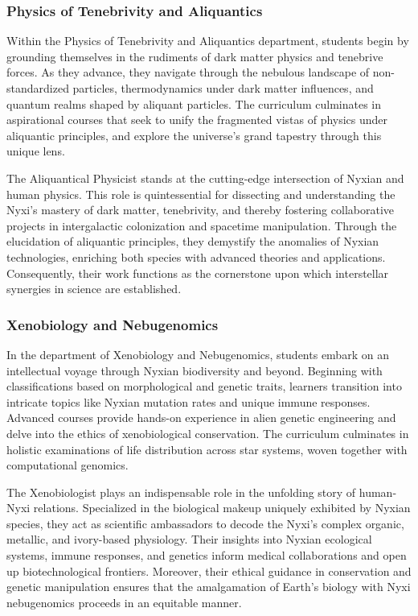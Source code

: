 \begin{center}
\end{center}

\subsubsection{Physics of Tenebrivity and Aliquantics}
Within the Physics of Tenebrivity and Aliquantics department, students begin by
grounding themselves in the rudiments of dark matter physics and tenebrive
forces. As they advance, they navigate through the nebulous landscape of
non-standardized particles, thermodynamics under dark matter influences, and
quantum realms shaped by aliquant particles. The curriculum culminates in
aspirational courses that seek to unify the fragmented vistas of physics under
aliquantic principles, and explore the universe's grand tapestry through this
unique lens.

The Aliquantical Physicist stands at the cutting-edge intersection of Nyxian
and human physics. This role is quintessential for dissecting and understanding
the Nyxi's mastery of dark matter, tenebrivity, and thereby fostering
collaborative projects in intergalactic colonization and spacetime
manipulation. Through the elucidation of aliquantic principles, they demystify
the anomalies of Nyxian technologies, enriching both species with advanced
theories and applications. Consequently, their work functions as the
cornerstone upon which interstellar synergies in science are established.

\subsubsection{Xenobiology and Nebugenomics}
In the department of Xenobiology and Nebugenomics, students embark on an
intellectual voyage through Nyxian biodiversity and beyond. Beginning with
classifications based on morphological and genetic traits, learners transition
into intricate topics like Nyxian mutation rates and unique immune responses.
Advanced courses provide hands-on experience in alien genetic engineering and
delve into the ethics of xenobiological conservation. The curriculum culminates
in holistic examinations of life distribution across star systems, woven
together with computational genomics.

The Xenobiologist plays an indispensable role in the unfolding story of
human-Nyxi relations. Specialized in the biological makeup uniquely exhibited
by Nyxian species, they act as scientific ambassadors to decode the Nyxi's
complex organic, metallic, and ivory-based physiology. Their insights into
Nyxian ecological systems, immune responses, and genetics inform medical
collaborations and open up biotechnological frontiers. Moreover, their ethical
guidance in conservation and genetic manipulation ensures that the amalgamation
of Earth's biology with Nyxi nebugenomics proceeds in an equitable manner.

